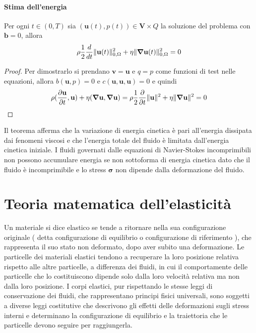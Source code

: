 \paragraph{Stima dell'energia}
\begin{theorem}
Per ogni $t \in (0,T)$ sia $(\mathbf{u}(t),p(t)) \in \mathbf{V} \times Q$ la soluzione del problema con $\mathbf{b}=0$, allora
\begin{equation*}
\rho \frac{1}{2} \frac{d}{dt} \Vert \mathbf{u} (t) \Vert^2_{0,\Omega} + \eta \Vert \boldsymbol{\nabla} \mathbf{u} (t) \Vert^2_{0,\Omega} = 0
\end{equation*}
\end{theorem}
\begin{proof}
Per dimostrarlo si prendano $\mathbf{v}=\mathbf{u}$ e $q=p$ come funzioni di test nelle equazioni, allora $b(\mathbf{u},p)=0$ e $c(\mathbf{u},\mathbf{u},\mathbf{u})=0$ e quindi
\begin{equation*}
\rho\ps{\frac{\partial \mathbf{u}}{\partial t}}{\mathbf{u}}+\eta\ps{\Nabla\mathbf{u}}{\Nabla\mathbf{u}} = 
\rho\frac{1}{2}\frac{\partial} {\partial t}\Vert\mathbf{u}\Vert^2+\eta\Vert \Nabla\mathbf{u}\Vert^2 = 0
\end{equation*}
\end{proof}
Il teorema afferma che la variazione di energia cinetica è pari all'energia dissipata dai fenomeni viscosi e che l'energia totale del fluido è limitata dall'energia cinetica iniziale.
I fluidi governati dalle equazioni di Navier-Stokes incomprimibili non possono accumulare energia se non sottoforma di energia cinetica dato che il fluido è incomprimibile e lo stress $\boldsymbol{\sigma}$ non dipende dalla deformazione del fluido. 

\section{Teoria matematica dell'elasticità}

Un materiale si dice elastico se tende a ritornare nella sua configurazione originale ( detta configurazione di equilibrio o configurazione di riferimento ), che rappresenta il suo stato non deformato, dopo aver subito una deformazione. Le particelle dei materiali elastici tendono a recuperare la loro posizione relativa rispetto alle altre particelle, a differenza dei fluidi, in cui il comportamente delle particelle che lo costituiscono dipende solo dalla loro velocità relativa ma non dalla loro posizione. I corpi elastici, pur rispettando le stesse leggi di conservazione dei fluidi, che rappresentano principi fisici universali, sono soggetti a diverse leggi costitutive che descrivono gli effetti delle deformazioni sugli stress interni e determinano la configurazione di equilibrio e la traiettoria che le particelle devono seguire per raggiungerla.

